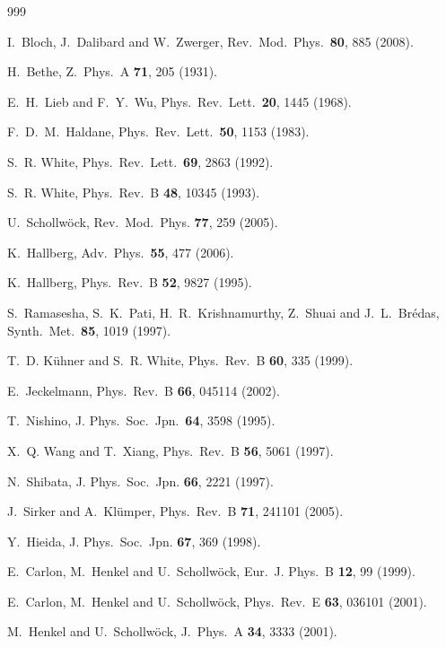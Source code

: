 \documentclass[a4paper,10pt,oneside,onecolumn,1p,times]{elsarticle}
\begin{document}
\begin{thebibliography}{999}

I.~Bloch, J.~Dalibard and W.~Zwerger, Rev.\ Mod.\ Phys.\ {\bf 80}, 885 (2008).

H.~Bethe, Z.\ Phys.\ A {\bf 71}, 205 (1931).

E.~H.~Lieb and F.~Y.~Wu, Phys.\ Rev.\ Lett.\ {\bf 20}, 1445 (1968).

F.~D.~M.~Haldane, Phys.\ Rev.\ Lett.\ {\bf 50}, 1153 (1983). 

S.~R. White, Phys.\ Rev.\ Lett.\ {\bf 69}, 2863 (1992). 

S.~R. White, Phys.\ Rev.\ B {\bf 48}, 10345 (1993). 

 U.~Schollw\"{o}ck, Rev.\ Mod.\ Phys. {\bf 77}, 259 (2005).

 K.~Hallberg, Adv.\ Phys.\ {\bf 55}, 477 (2006).

K.~Hallberg, Phys.\ Rev.\ B {\bf 52}, 9827 (1995).

S.~Ramasesha, S.~K.~Pati, H.~R.~Krishnamurthy, Z.~Shuai and J.~L.~Br{\'e}das, Synth.\ Met.\ {\bf 85}, 1019 (1997).

T.~D. K\"{u}hner and S.~R. White, Phys.\ Rev.\ B {\bf 60}, 335 (1999).

E.~Jeckelmann, Phys.\ Rev.\ B {\bf 66}, 045114 (2002).
 
T.~Nishino, J. Phys.\ Soc.\ Jpn.\ {\bf 64}, 3598 (1995).

X.~Q. Wang and T.~Xiang, Phys.\ Rev.\ B {\bf 56}, 5061 (1997).

N.~Shibata, J. Phys.\ Soc.\ Jpn. {\bf 66}, 2221 (1997).

J.~Sirker and A.~Kl\"{u}mper, Phys.\ Rev.\ B {\bf 71}, 241101 (2005).

Y.~Hieida, J. Phys.\ Soc.\ Jpn. {\bf 67}, 369 (1998).

E.~Carlon, M.~Henkel and U.~Schollw\"{o}ck, Eur.\ J. Phys.\ B {\bf 12}, 99 (1999).

E.~Carlon, M.~Henkel and U.~Schollw\"{o}ck, Phys.\ Rev.\ E {\bf 63}, 036101 (2001).

M.~Henkel and U.~Schollw\"{o}ck, J.\ Phys.\ A {\bf 34}, 3333 (2001).


\end{thebibliography}
\end{document}
